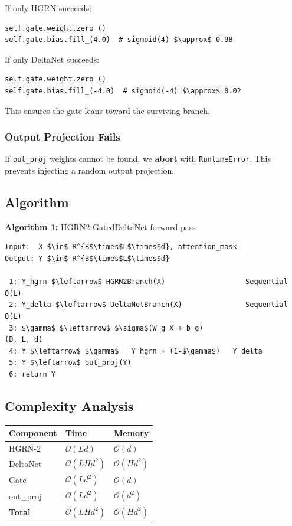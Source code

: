If only HGRN succeeds:
\begin{lstlisting}
self.gate.weight.zero_()
self.gate.bias.fill_(4.0)  # sigmoid(4) $\approx$ 0.98
\end{lstlisting}

If only DeltaNet succeeds:
\begin{lstlisting}
self.gate.weight.zero_()
self.gate.bias.fill_(-4.0)  # sigmoid(-4) $\approx$ 0.02
\end{lstlisting}

This ensures the gate leans toward the surviving branch.

\subsubsection{Output Projection Fails}

If \texttt{out\_proj} weights cannot be found, we \textbf{abort} with \texttt{RuntimeError}. 
This prevents injecting a random output projection.

\subsection{Algorithm}

\textbf{Algorithm 1:} HGRN2-GatedDeltaNet forward pass
\begin{lstlisting}
Input:  X $\in$ R^{B$\times$L$\times$d}, attention_mask
Output: Y $\in$ R^{B$\times$L$\times$d}

 1: Y_hgrn $\leftarrow$ HGRN2Branch(X)                   Sequential O(L)
 2: Y_delta $\leftarrow$ DeltaNetBranch(X)               Sequential O(L)
 3: $\gamma$ $\leftarrow$ $\sigma$(W_g X + b_g)                        (B, L, d)
 4: Y $\leftarrow$ $\gamma$   Y_hgrn + (1-$\gamma$)   Y_delta
 5: Y $\leftarrow$ out_proj(Y)
 6: return Y
\end{lstlisting}

\subsection{Complexity Analysis}

\begin{table}[H]
\centering
\small
\begin{tabular}{lll}
\toprule
\textbf{Component} & \textbf{Time} & \textbf{Memory} \\
\midrule
HGRN-2 & $\mathcal{O}(L d)$ & $\mathcal{O}(d)$ \\
DeltaNet & $\mathcal{O}(L H d^2)$ & $\mathcal{O}(H d^2)$ \\
Gate & $\mathcal{O}(L d^2)$ & $\mathcal{O}(d)$ \\
out\_proj & $\mathcal{O}(L d^2)$ & $\mathcal{O}(d^2)$ \\
\textbf{Total} & $\mathcal{O}(L H d^2)$ & $\mathcal{O}(H d^2)$ \\
\bottomrule
\end{tabular}
\end{table}

